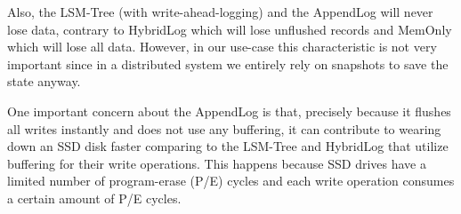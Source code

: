 Also, the LSM-Tree (with write-ahead-logging) and the AppendLog will never lose data, contrary to HybridLog which will lose unflushed records and MemOnly which will lose all data. However, in our use-case this characteristic is not very important since in a distributed system we entirely rely on snapshots to save the state anyway.

One important concern about the AppendLog is that, precisely because it flushes all writes instantly and does not use any buffering, it can contribute to wearing down an SSD disk faster comparing to the LSM-Tree and HybridLog that utilize buffering for their write operations. This happens because SSD drives have a limited number of program-erase (P/E) cycles and each write operation consumes a certain amount of P/E cycles.
